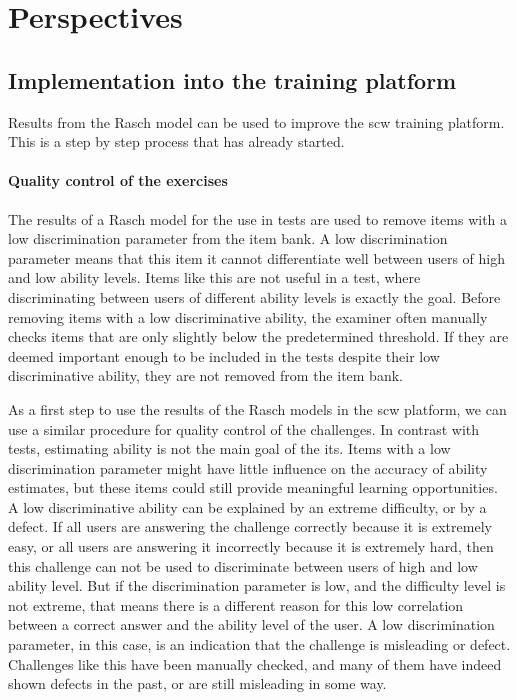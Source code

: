 \section{Perspectives}
\label{sec:its-perspectives}

\subsection{Implementation into the training platform}
Results from the Rasch model can be used to improve the \gls{scw} training platform.
This is a step by step process that has already started.

\paragraph{Quality control of the exercises}
The results of a Rasch model for the use in tests are used to remove items with a low discrimination parameter from the item bank. 
A low discrimination parameter means that this item it cannot differentiate well between users of high and low ability levels.
Items like this are not useful in a test, where discriminating between users of different ability levels is exactly the goal.
Before removing items with a low discriminative ability, the examiner often manually checks items that are only slightly below the predetermined threshold.
If they are deemed important enough to be included in the tests despite their low discriminative ability, they are not removed from the item bank.

As a first step to use the results of the Rasch models in the \gls{scw} platform, we can use a similar procedure for quality control of the challenges.
In contrast with tests, estimating ability is not the main goal of the \gls{its}.
Items with a low discrimination parameter might have little influence on the accuracy of ability estimates, but these items could still provide meaningful learning opportunities.
A low discriminative ability can be explained by an extreme difficulty, or by a defect.
If all users are answering the challenge correctly because it is extremely easy, or all users are answering it incorrectly because it is extremely hard, then this challenge can not be used to discriminate between users of high and low ability level.
But if the discrimination parameter is low, and the difficulty level is not extreme, that means there is a different reason for this low correlation between a correct answer and the ability level of the user.
A low discrimination parameter, in this case, is an indication that the challenge is misleading or defect.
Challenges like this have been manually checked, and many of them have indeed shown defects in the past, or are still misleading in some way.

